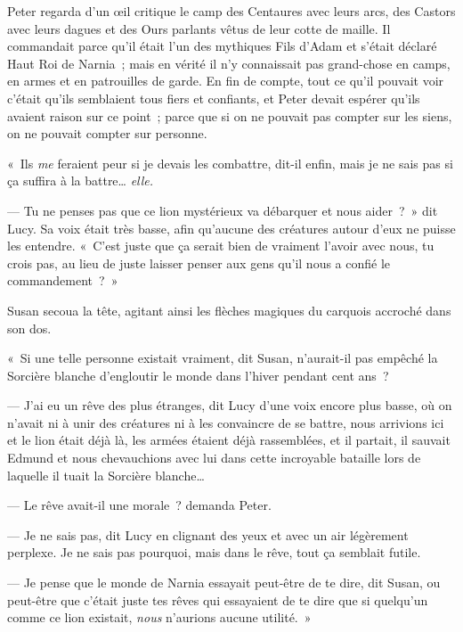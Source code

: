 Peter regarda d'un œil critique le camp des Centaures avec leurs arcs, des Castors avec leurs dagues et des Ours parlants vêtus de leur cotte de maille.
Il commandait parce qu'il était l'un des mythiques Fils d'Adam et s'était déclaré Haut Roi de Narnia~; mais en vérité il n'y connaissait pas grand-chose en camps, en armes et en patrouilles de garde.
En fin de compte, tout ce qu'il pouvait voir c'était qu'ils semblaient tous fiers et confiants, et Peter devait espérer qu'ils avaient raison sur ce point~; parce que si on ne pouvait pas compter sur les siens, on ne pouvait compter sur personne.

«~Ils \emph{me} feraient peur si je devais les combattre, dit-il enfin, mais je ne sais pas si ça suffira à la battre…
\emph{elle.}

--- Tu ne penses pas que ce lion mystérieux va débarquer et nous aider~?~»
dit Lucy.
Sa voix était très basse, afin qu'aucune des créatures autour d'eux ne puisse les entendre.
«~C'est juste que ça serait bien de vraiment l'avoir avec nous, tu crois pas, au lieu de juste laisser penser aux gens qu'il nous a confié le commandement~?~»

Susan secoua la tête, agitant ainsi les flèches magiques du carquois accroché dans son dos.

«~Si une telle personne existait vraiment, dit Susan, n'aurait-il pas empêché la Sorcière blanche d'engloutir le monde dans l'hiver pendant cent ans~?

--- J'ai eu un rêve des plus étranges, dit Lucy d'une voix encore plus basse, où on n'avait ni à unir des créatures ni à les convaincre de se battre, nous arrivions ici et le lion était déjà là, les armées étaient déjà rassemblées, et il partait, il sauvait Edmund et nous chevauchions avec lui dans cette incroyable bataille lors de laquelle il tuait la Sorcière blanche…

--- Le rêve avait-il une morale~? demanda Peter.

--- Je ne sais pas, dit Lucy en clignant des yeux et avec un air légèrement perplexe.
Je ne sais pas pourquoi, mais dans le rêve, tout ça semblait futile.

--- Je pense que le monde de Narnia essayait peut-être de te dire, dit Susan, ou peut-être que c'était juste tes rêves qui essayaient de te dire que si quelqu'un comme ce lion existait, \emph{nous} n'aurions aucune utilité.~»


